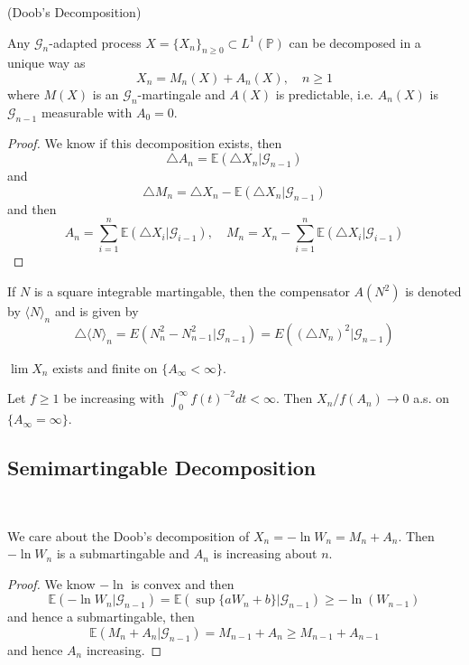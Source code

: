 \begin{theorem}
    (Doob's Decomposition)\par
    Any $\mathcal{G}_n$-adapted process $X = \{X_n\}_{n\geq 0} \subset L^1(\mathbb{P})$ can be decomposed in a unique way as
    \[
    X_n = M_n(X) + A_n(X),\quad n\geq 1
    \]
    where $M(X)$ is an $\mathcal{G}_n$-martingale and $A(X)$ is predictable, i.e. $A_n(X)$ is $\mathcal{G}_{n-1}$ measurable with $A_0 = 0$.
\end{theorem}
\begin{proof}
    We know if this decomposition exists, then
    \[
    \triangle A_n = \mathbb{E}(\triangle X_n|\mathcal{G}_{n-1})
    \]
    and
    \[
    \triangle M_n = \triangle X_n - \mathbb{E}(\triangle X_n|\mathcal{G}_{n-1})
    \]
    and then
    \[
    A_n = \sum\limits_{i=1}^n \mathbb{E}(\triangle X_i|\mathcal{G}_{i-1}),\quad M_n = X_n - \sum\limits_{i=1}^n \mathbb{E}(\triangle X_i|\mathcal{G}_{i-1})
    \]
\end{proof}

\begin{proposition}
    If $N$ is a square integrable martingable, then the compensator $A(N^2)$ is denoted by $\langle N\rangle_n$ and is given by
    \[
    \triangle\langle N \rangle_n = E(N^2_n - N^2_{n-1}|\mathcal{G}_{n-1}) = E((\triangle N_n)^2|\mathcal{G}_{n-1})
    \]
\end{proposition}

\begin{theorem}
    $\lim X_n$ exists and finite on $\{A_{\infty} < \infty\}$.
\end{theorem}

\begin{theorem}
    Let $f\geq 1$ be increasing with $\int_0^{\infty} f(t)^{-2} dt < \infty$. Then $X_n/f(A_n) \to 0$ a.s. on $\{A_{\infty} = \infty\}$.
\end{theorem}
\subsection{Semimartingable Decomposition}

\begin{definition}\ \par
    We care about the Doob's decomposition of $X_n = -\ln W_n = M_n+A_n$. Then $-\ln W_n$ is a submartingable and $A_n$ is increasing about $n$.
\end{definition}
\begin{proof}
    We know $-\ln$ is convex and then
    \[
    \mathbb{E}(-\ln W_n|\mathcal{G}_{n-1}) = \mathbb{E}(\sup\{aW_n+b\}|\mathcal{G}_{n-1}) \geq -\ln(W_{n-1})
    \]
    and hence a submartingable, then
    \[
    \mathbb{E}(M_n+A_n|\mathcal{G}_{n-1}) = M_{n-1}+A_n \geq M_{n-1} + A_{n-1}
    \]
    and hence $A_n$ increasing.
\end{proof}

